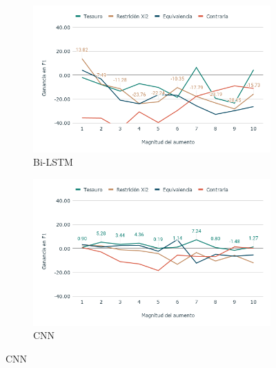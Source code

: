 \begin{figure}[hbt!]
    \begin{subfigure}[b]{0.5\textwidth}
        \includegraphics[width=\textwidth]{sections/figures/Bi-LSTM2019.png}
        \caption{Bi-LSTM}
    \end{subfigure}
    \hfill
    \begin{subfigure}[b]{0.5\textwidth}
        \includegraphics[width=\textwidth]{sections/figures/CNN2019.png}
        \caption{CNN}
    \end{subfigure}
    

\end{figure}
